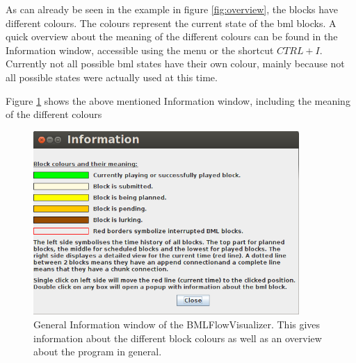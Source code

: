 \documentclass[12pt,a4paper]{article}
\begin{document}
As can already be seen in the example in figure \ref{fig:overview}, the blocks have different colours. The colours represent the current state of the bml blocks. A quick overview about the meaning of the different colours can be found in the Information window, accessible using the menu or the shortcut $CTRL+I$. Currently not all possible bml states have their own colour, mainly because not all possible states were actually used at this time.

Figure \ref{fig:help} shows the above mentioned Information window, including the meaning of the different colours

\begin{figure}[!htb]
\centering
 \includegraphics[width=0.9\textwidth]{images/bmlFlowInfo.png}
 \caption{General Information window of the BMLFlowVisualizer. This gives information about the different block colours as well as an overview about the program in general.}
 \label{fig:help}
\end{figure}
\end{document}
